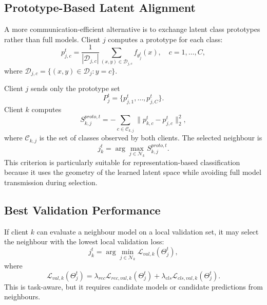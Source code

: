 \documentclass[conference]{IEEEtran}
\begin{document}
\subsection{Prototype-Based Latent Alignment}
\label{subsec:prototype-based-latent-alignment}
A more communication-efficient alternative is to exchange latent class prototypes rather than full models. Client \(j\) computes a prototype for each class:
\begin{equation}
    p_{j,c}^{t}
    =
    \frac{1}{|\mathcal{D}_{j,c}|}
    \sum_{(x,y)\in\mathcal{D}_{j,c}}
    f_{\theta_j^t}(x),
    \quad c=1,\dots,C,
    \label{eq:auto-024}
\end{equation}
where \(\mathcal{D}_{j,c}=\{(x,y)\in\mathcal{D}_j:y=c\}\).

Client \(j\) sends only the prototype set
\begin{equation}
    P_j^t = \{p_{j,1}^{t},\dots,p_{j,C}^{t}\}.
    \label{eq:auto-025}
\end{equation}
Client \(k\) computes
\begin{equation}
    S_{k,j}^{proto,t}
    =
    -\sum_{c\in\mathcal{C}_{k,j}}
    \|p_{k,c}^{t}-p_{j,c}^{t}\|_2^2,
    \label{eq:proto_alignment}
\end{equation}
where \(\mathcal{C}_{k,j}\) is the set of classes observed by both clients. The selected neighbour is
\begin{equation}
    j_k^t = \arg\max_{j\in\mathcal{N}_k} S_{k,j}^{proto,t}.
    \label{eq:auto-026}
\end{equation}
This criterion is particularly suitable for representation-based classification because it uses the geometry of the learned latent space while avoiding full model transmission during selection.

\subsection{Best Validation Performance}
\label{subsec:best-validation-performance}
If client \(k\) can evaluate a neighbour model on a local validation set, it may select the neighbour with the lowest local validation loss:
\begin{equation}
    j_k^t
    =
    \arg\min_{j\in\mathcal{N}_k}
    \mathcal{L}_{val,k}(\Theta_j^t),
    \label{eq:auto-027}
\end{equation}
where
\begin{equation}
\mathcal{L}_{val,k}(\Theta_j^t)
=
\lambda_{rec}\mathcal{L}_{rec,val,k}(\Theta_j^t)
+
\lambda_{cls}\mathcal{L}_{cls,val,k}(\Theta_j^t).
    \label{eq:auto-028}
\end{equation}
This is task-aware, but it requires candidate models or candidate predictions from neighbours.
\end{document}
